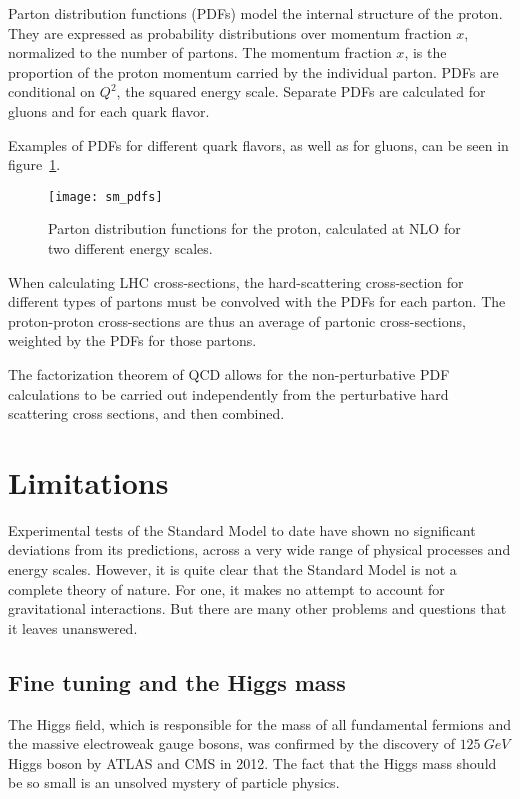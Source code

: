 Parton distribution functions (PDFs) model the internal structure of the proton.
They are expressed as probability distributions over momentum fraction $x$, normalized to the number of partons.
The momentum fraction $x$, is the proportion of the proton momentum carried by the individual parton.
PDFs are conditional on $Q^2$, the squared energy scale.
Separate PDFs are calculated for gluons and for each quark flavor.

Examples of PDFs for different quark flavors, as well as for gluons, can be seen in figure~\ref{fig:sm_pdfs}.

\begin{figure}[h!]
    \centering
\texttt{[image: sm\_pdfs]}
\caption{Parton distribution functions for the proton, calculated at NLO for two different energy scales.}
\label{fig:sm_pdfs}
\end{figure}\cite{sm-pdf-2009}

When calculating LHC cross-sections, the hard-scattering cross-section for different types of partons
must be convolved with the PDFs for each parton.
The proton-proton cross-sections are thus an average of partonic cross-sections, weighted by the PDFs for those partons.

The factorization theorem of QCD allows for the non-perturbative PDF calculations to be carried out independently from
the perturbative hard scattering cross sections, and then combined.

\section{Limitations}\label{sec:sm_limits}

Experimental tests of the Standard Model to date have shown no significant deviations from its predictions,
across a very wide range of physical processes and energy scales.
However, it is quite clear that the Standard Model is not a complete theory of nature.
For one, it makes no attempt to account for gravitational interactions.
But there are many other problems and questions that it leaves unanswered.

\subsection{Fine tuning and the Higgs mass}\label{subsec:sm_hierarchy}

The Higgs field, which is responsible for the mass of all fundamental fermions and the massive electroweak gauge bosons,
was confirmed by the discovery of $125~GeV$ Higgs boson by ATLAS and CMS in 2012.
The fact that the Higgs mass should be so small is an unsolved mystery of particle physics.

